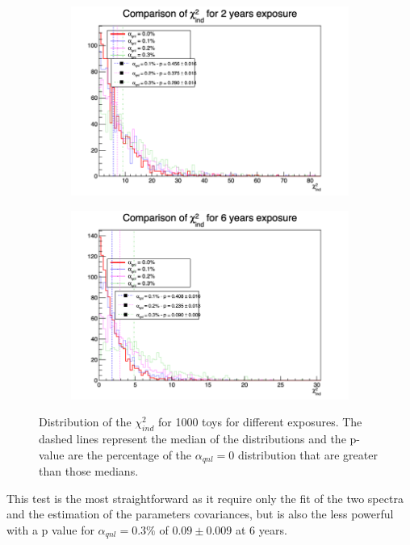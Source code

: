 \documentclass[../main.tex]{subfiles}
\begin{document}
\begin{figure}[th]
  \begin{subfigure}[t]{0.48\linewidth}
    \includegraphics[width=\linewidth]{images/joint_fit/stat_tests/chi2_ind_2y.png}
  \end{subfigure}
  \begin{subfigure}[t]{0.48\linewidth}
    \includegraphics[width=\linewidth]{images/joint_fit/stat_tests/chi2_ind_6y.png}
  \end{subfigure}
  \caption{Distribution of the $\chi^2_{ind}$ for 1000 toys for different exposures. The dashed lines represent the median of the distributions and the p-value are the percentage of the $\alpha_{qnl} = 0$ distribution that are greater than those medians.}
  \label{fig:joint_fit:chi2_ind}
\end{figure}

This test is the most straightforward as it require only the fit of the two spectra and the estimation of the parameters covariances, but is also the less powerful with a p value for $\alpha_{qnl} = 0.3\%$ of $0.09 \pm 0.009$ at 6 years.
\end{document}
